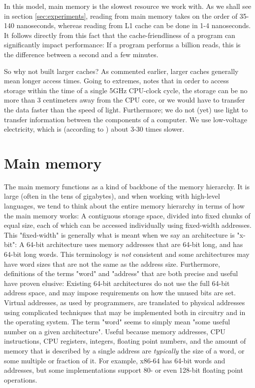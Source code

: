 In this model, main memory is the slowest resource we work with. As we shall see
in section \ref{sec:experiments},  reading from main memory takes on the
order of 35-140 nanoseconds, whereas reading from L1 cache can be done in 1-4
nanoseconds. It follows directly from this fact that the cache-friendliness of a
program can significantly impact performance: If a program performs a billion
reads, this is the difference between a second and a few minutes.

So why not built larger caches? As commented earlier, larger caches generally
mean longer access times. Going to extremes, \citeauthor{mckenney} \cite{mckenney} notes that in order
to access storage within the time of a single 5GHz CPU-clock cycle, the storage
can be no more than 3 centimeters away from the CPU core, or we would have to
transfer the data faster than the speed of light. Furthermore; we do not (yet)
use light to transfer information between the components of a computer. We use
low-voltage electricity, which is (according to \cite{mckenney}) about 3-30
times slower.

\section{Main memory}
The main memory functions as a kind of backbone of the memory hierarchy. It is
large (often in the tens of gigabytes), and when working with high-level
languages, we tend to think about the entire memory
hierarchy in terms of how the main memory works: A contiguous storage space,
divided into fixed chunks of equal size, each of which can be
accessed individually using fixed-width addresses. This "fixed-width" is
generally what is meant when we say an architecture is "x-bit": A 64-bit
architecture uses memory addresses that are 64-bit long, and has 64-bit long
words. This terminology is \textit{not} consistent and some architectures may
have word sizes that are not the same as the address size. Furthermore,
definitions of the terms "word" and "address" that are both precise and useful
have proven elusive: Existing 64-bit architectures do not use the full 64-bit
address space, and may impose requirements on how the unused bits are set.
Virtual addresses, as used by programmers, are translated to physical addresses
using complicated techniques that may be implemented both in circuitry and in
the operating system. The term "word" seems to simply mean "some useful number
on a given architecture". Useful because memory addresses, CPU instructions, CPU
registers, integers, floating point numbers, and the amount of memory that is
described by a single address are \textit{typically} the size of a word, or some
multiple or fraction of it. For example, x86-64 has 64-bit words and addresses,
but some implementations support 80- or even 128-bit floating point operations.

